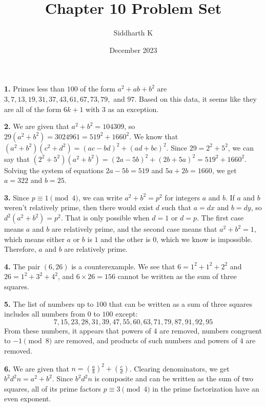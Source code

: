 \documentclass{article}
\title{Chapter 10 Problem Set}
\author{Siddharth K}
\date{December 2023}
\begin{document}
\maketitle

\textbf{1.} Primes less than $100$ of the form $a^2 + ab + b^2$ are $3, 7, 13, 19, 31, 37, 43, 61, 67, 73, 79,$ and $97$. Based on this data, it seems like they are all of the form $6k + 1$ with $3$ as an exception.
\newline

\textbf{2.} We are given that $a^2 + b^2 = 104309$, so $29(a^2 + b^2) = 3024961 = 519^2 + 1660^2$. We know that $(a^2 + b^2)(c^2 + d^2) = (ac - bd)^2 + (ad + bc)^2$. Since $29 = 2^2 + 5^2$, we can say that $(2^2 + 5^2)(a^2 + b^2) = (2a - 5b)^2 + (2b + 5a)^2 = 519^2 + 1660^2$. Solving the system of equations $2a - 5b = 519$ and $5a + 2b = 1660$, we get $a = 322$ and $b = 25$.
\newline

\textbf{3.} Since $p \equiv 1 \pmod{4}$, we can write $a^2 + b^2 = p^2$ for integers $a$ and $b$. If $a$ and $b$ weren't relatively prime, then there would exist $d$ such that $a = dx$ and $b = dy$, so $d^2(a^2 + b^2) = p^2$. That is only possible when $d = 1$ or $d = p$. The first case means $a$ and $b$ are relatively prime, and the second case means that $a^2 + b^2 = 1$, which means either $a$ or $b$ is $1$ and the other is $0$, which we know is impossible. Therefore, $a$ and $b$ are relatively prime.
\newline

\textbf{4.} The pair $(6, 26)$ is a counterexample. We see that $6 = 1^2 + 1^2 + 2^2$ and $26 = 1^2 + 3^2 + 4^2$, and $6 \times 26 = 156$ cannot be written as the sum of three squares.
\newline

\textbf{5.} The list of numbers up to $100$ that can be written as a sum of three squares includes all numbers from $0$ to $100$ except: $$7, 15, 23, 28, 31, 39, 47, 55, 60, 63, 71, 79, 87, 91, 92, 95$$
From these numbers, it appears that powers of $4$ are removed, numbers congruent to $-1 \pmod{8}$ are removed, and products of such numbers and powers of $4$ are removed.
\newline

\textbf{6.} We are given that $n = \left(\frac{a}{b}\right)^2 + \left(\frac{c}{d}\right)$. Clearing denominators, we get $b^2d^2n = a^2 + b^2$. Since $b^2d^2n$ is composite and can be written as the sum of two squares, all of its prime factors $p \equiv 3 \pmod{4}$ in the prime factorization have an even exponent.
\newline
\end{document}
